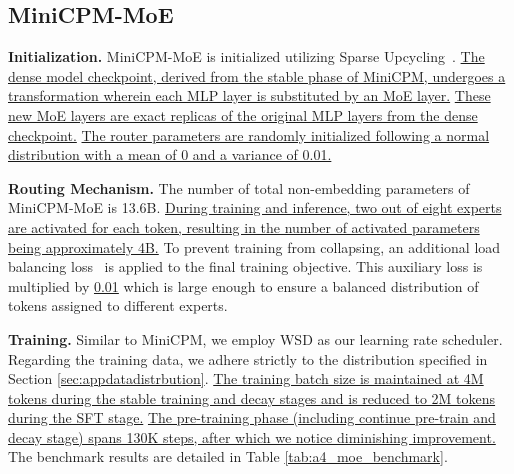 \subsection{MiniCPM-MoE}

\textbf{Initialization.}
MiniCPM-MoE is initialized utilizing Sparse Upcycling~\citep{komatsuzaki2022sparse}. \uline{The dense model checkpoint, derived from the stable phase of MiniCPM, undergoes a transformation wherein each MLP layer is substituted by an MoE layer.} \uline{These new MoE layers are exact replicas of the original MLP layers from the dense checkpoint.} \uline{The router parameters are randomly initialized following a normal distribution with a mean of 0 and a variance of 0.01.}

\textbf{Routing Mechanism.}
The number of total non-embedding parameters of MiniCPM-MoE is 13.6B. \uline{During training and inference, two out of eight experts are activated for each token, resulting in the number of activated parameters being approximately 4B.} To prevent training from collapsing, an additional load balancing loss~\citep{fedus2022switch} is applied to the final training objective. This auxiliary loss is multiplied by \uline{0.01} which is large enough to ensure a balanced distribution of tokens assigned to different experts.

\textbf{Training.}
Similar to MiniCPM, we employ WSD as our learning rate scheduler. Regarding the training data, we adhere strictly to the distribution specified in Section \ref{sec:appdatadistrbution}. \uline{The training batch size is maintained at 4M tokens during the stable training and decay stages and is reduced to 2M tokens during the SFT stage.} \uline{The pre-training phase (including continue pre-train and decay stage) spans 130K steps, after which we notice diminishing improvement.} The benchmark results are detailed in Table \ref{tab:a4_moe_benchmark}.

